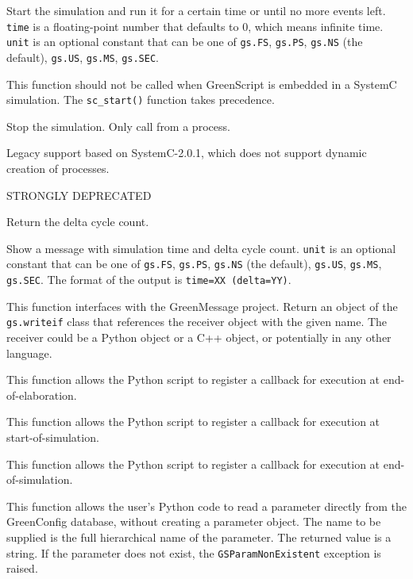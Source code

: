 \documentclass[12pt,oneside]{gsbook}
\begin{document}
 {Start the simulation and run it for a
certain time or until no more events left. \texttt{time} is a
floating-point number that defaults to 0, which means infinite
time. \texttt{unit} is an optional constant that can be one of
\texttt{gs.FS}, \texttt{gs.PS}, \texttt{gs.NS} (the
default), \texttt{gs.US}, \texttt{gs.MS}, \texttt{gs.SEC}.

This function should not be called when GreenScript is embedded in a SystemC
simulation.  The \texttt{sc\_start()} function takes precedence.}

 {Stop the simulation.  Only call from a process.}

 {Legacy support based on
SystemC-2.0.1, which does not support dynamic creation of processes.

STRONGLY DEPRECATED}

 {Return the delta cycle count.}

 {Show a message with simulation time and delta
cycle count. \texttt{unit} is an optional constant that can be one of
\texttt{gs.FS}, \texttt{gs.PS}, \texttt{gs.NS} (the
default), \texttt{gs.US}, \texttt{gs.MS},
\texttt{gs.SEC}. The format of the output is \texttt{time=XX
(delta=YY)}.}

 {This function interfaces with the
  GreenMessage project. Return an object of the \texttt{gs.writeif} class that
  references the receiver object with the given name.  The receiver
  could be a Python object or a C++ object, or potentially in any
  other language.}

 {This function allows the Python
script to register a callback for execution at end-of-elaboration.}

 {This function allows the Python
script to register a callback for execution at start-of-simulation.}

 {This function allows the Python
script to register a callback for execution at end-of-simulation.}

 {This function allows the user's Python code to read a parameter
directly from the GreenConfig database, without creating a parameter object.
The name to be supplied is the full hierarchical name of the parameter.  The
returned value is a string.  If the parameter does not exist, the
\texttt{GSParamNonExistent} exception is raised.}
\end{document}
